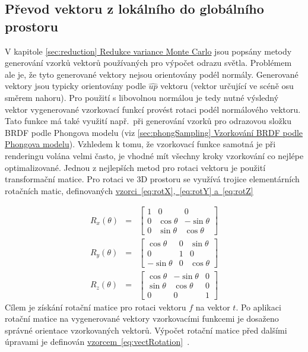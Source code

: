 \documentclass[czech,master]{diploma}
\newcommand{\uvec}[1]{\hat{#1}}
\newcommand{\fromVect}{f}
\newcommand{\toVect}{t}
\begin{document}
\subsection{Převod vektoru z lokálního do globálního prostoru}
V kapitole \hyperref[sec:reduction]{\ref{sec:reduction} Redukce variance Monte Carlo} jsou popsány metody generování vzorků vektorů používaných pro výpočet odrazu světla. Problémem ale je, že tyto generované vektory nejsou orientovány podél normály. Generované vektory jsou typicky orientovány podle \(\uvec{up}\) vektoru (vektor určující ve scéně osu směrem nahoru). Pro použití s libovolnou normálou je tedy nutné výsledný vektor vygenerované vzorkovací funkcí provést rotaci podél normálového vektoru. Tato funkce má také využití např.\ při generování vzorků pro odrazovou složku BRDF podle Phongova modelu (viz \hyperref[sec:phongSampling]{\ref{sec:phongSampling} Vzorkování BRDF podle Phongova modelu}). Vzhledem k tomu, že vzorkovací funkce samotná je při renderingu volána velmi často, je vhodné mít všechny kroky vzorkování co nejlépe optimalizované. Jednou z nejlepších metod pro rotaci vektoru je použití transformační matice. Pro rotaci ve 3D prostoru se využívá trojice elementárních rotačních matic, definovaných \hyperref[eq:rotX]{vzorci~\ref{eq:rotX},~\ref{eq:rotY} a~\ref{eq:rotZ}}~\cite{HughesDamEtAl13}\par
\begin{eqnarray}
  R_x(\theta) & = & \begin{bmatrix}
    1 & 0          & 0           \\
    0 & \cos\theta & -\sin\theta \\
    0 & \sin\theta & \cos\theta
  \end{bmatrix} \label{eq:rotX} \\
  R_y(\theta) & = & \begin{bmatrix}
    \cos\theta  & 0 & \sin\theta \\
    0           & 1 & 0          \\
    -\sin\theta & 0 & \cos\theta
  \end{bmatrix} \label{eq:rotY} \\
  R_z(\theta) & = & \begin{bmatrix}
    \cos\theta & -\sin\theta & 0 \\
    \sin\theta & \cos\theta  & 0 \\
    0          & 0           & 1
  \end{bmatrix}\label{eq:rotZ}
\end{eqnarray}
Cílem je získání rotační matice pro rotaci vektoru \(\fromVect\) na vektor \(\toVect\). Po aplikaci rotační matice na vygenerované vektory vzorkovacími funkcemi je dosaženo správné orientace vzorkovaných vektorů. Výpočet rotační matice před dalšími úpravami je definován \hyperref[eq:vectRotation]{vzorcem~\ref{eq:vectRotation}}~\cite{MollerHughesVectRotation}.
\end{document}
